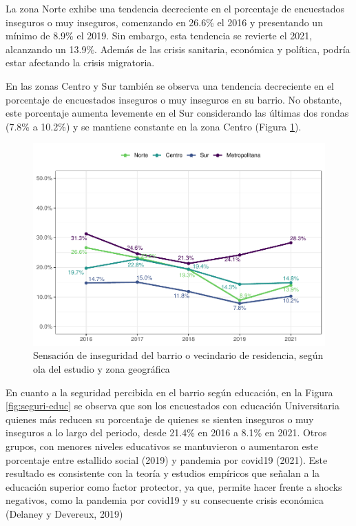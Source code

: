 \documentclass[
  12pt,
]{book}
\begin{document}
La zona Norte exhibe una tendencia decreciente en el porcentaje de encuestados inseguros o muy inseguros, comenzando en 26.6\% el 2016 y presentando un mínimo de 8.9\% el 2019. Sin embargo, esta tendencia se revierte el 2021, alcanzando un 13.9\%. Además de las crisis sanitaria, económica y política, podría estar afectando la crisis migratoria.

En las zonas Centro y Sur también se observa una tendencia decreciente en el porcentaje de encuestados inseguros o muy inseguros en su barrio. No obstante, este porcentaje aumenta levemente en el Sur considerando las últimas dos rondas (7.8\% a 10.2\%) y se mantiene constante en la zona Centro (Figura \ref{fig:seguri-zona}).

\begin{figure}

{\centering \includegraphics{reporte-elsoc_files/figure-latex/seguri-zona-1} 

}

\caption{Sensación de inseguridad del barrio o vecindario de residencia, según ola del estudio y zona geográfica}\label{fig:seguri-zona}
\end{figure}

En cuanto a la seguridad percibida en el barrio según educación, en la Figura \ref{fig:seguri-educ} se observa que son los encuestados con educación Universitaria quienes más reducen su porcentaje de quienes se sienten inseguros o muy inseguros a lo largo del periodo, desde 21.4\% en 2016 a 8.1\% en 2021. Otros grupos, con menores niveles educativos se mantuvieron o aumentaron este porcentaje entre estallido social (2019) y pandemia por covid19 (2021). Este resultado es consistente con la teoría y estudios empíricos que señalan a la educación superior como factor protector, ya que, permite hacer frente a shocks negativos, como la pandemia por covid19 y su consecuente crisis económica (Delaney y Devereux, 2019)
\end{document}
